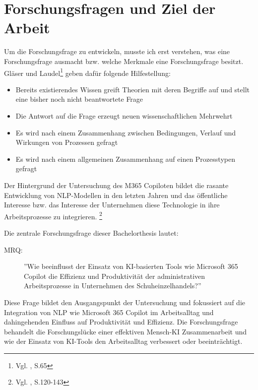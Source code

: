 
\section{Forschungsfragen und Ziel der Arbeit}

Um die Forschungsfrage zu entwickeln, musste ich erst verstehen, was eine Forschungsfrage ausmacht bzw. welche Merkmale eine Forschungsfrage besitzt. Gläser und Laudel\footnote{Vgl. \cite{Glaeser2010}, S.65} geben dafür folgende Hilfestellung:
\begin{itemize}
    \item Bereits existierendes Wissen greift Theorien mit deren Begriffe auf und stellt eine bisher noch nicht beantwortete Frage
    \item Die Antwort auf die Frage erzeugt neuen wissenschaftlichen Mehrwehrt
    \item Es wird nach einem Zusammenhang zwischen Bedingungen, Verlauf und Wirkungen von Prozessen gefragt
    \item Es wird nach einem allgemeinen Zusammenhang auf einen Prozesstypen gefragt
\end{itemize}

Der Hintergrund der Untersuchung des M365 Copiloten bildet die rasante Entwicklung von NLP-Modellen in den letzten Jahren und das öffentliche Interesse bzw. das Interesse der Unternehmen diese Technologie in ihre Arbeitsprozesse zu integrieren. \footnote{Vgl. \cite{Syed2020}, S.120-143}

Die zentrale Forschungsfrage dieser Bachelorthesis lautet:

\begin{description}
    \item[MRQ:] ''Wie beeinflusst der Einsatz von KI-basierten Tools wie Microsoft 365 Copilot die Effizienz und Produktivität der administrativen Arbeitsprozesse in Unternehmen des Schuheinzelhandels?''
\end{description}

Diese Frage bildet den Ausgangspunkt der Untersuchung und fokussiert auf die Integration von NLP wie Microsoft 365 Copilot im Arbeitsalltag und dahingehenden Einfluss auf Produktivität und Effizienz. Die Forschungsfrage behandelt die Forschungslücke einer effektiven Mensch-KI Zusammenarbeit und wie der Einsatz von KI-Tools den Arbeitsalltag verbessert oder beeinträchtigt.

